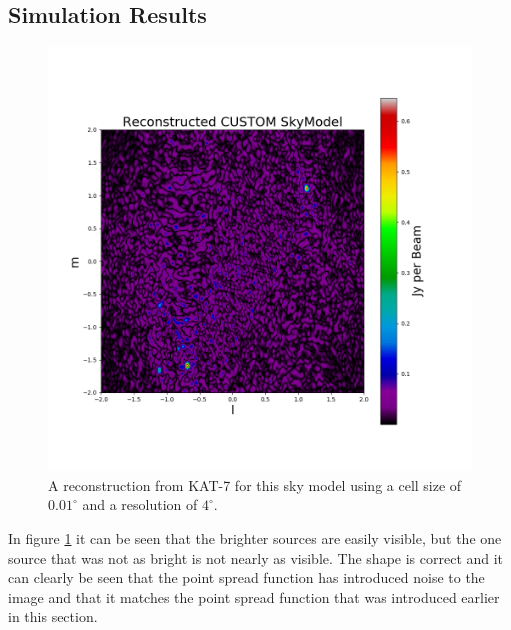 \subsection{Simulation Results}
\begin{figure}[H]
    \centering
    \includegraphics[scale=0.4]{images/RECON_KAT_7_4_POINT.png}
    \caption{A reconstruction from KAT-7 for this sky model using a cell size of $0.01^\circ$ and a resolution of $4^\circ$.}
    \label{fig:kat-7_recon}
\end{figure}
In figure \ref{fig:kat-7_recon} it can be seen that the brighter sources are easily visible, but the one source that was not as bright is not nearly as visible.  The shape is correct and it can clearly be seen that the point spread function has introduced noise to the image and that it matches the point spread function that was introduced earlier in this section.\\
